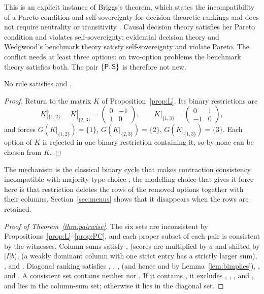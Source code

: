 This is an explicit instance of Briggs's theorem, which states the incompatibility of a Pareto
condition and self-sovereignty for decision-theoretic rankings and does not require neutrality or
transitivity \autocite[21--26]{briggs2010}. Causal decision theory satisfies her Pareto condition
and violates self-sovereignty; evidential decision theory and Wedgwood's benchmark theory
\autocite{wedgwood2013} satisfy self-sovereignty and violate Pareto. The conflict needs at least three
options: on two-option problems the benchmark theory satisfies both. The pair
$\{\textup{\textsf{P}},\textup{\textsf{S}}\}$ is therefore not new.

\begin{proposition}\label{prop:PC}
No rule satisfies  and .
\end{proposition}

\begin{proof}
Return to the matrix $K$ of Proposition~\ref{prop:L}. Its binary restrictions are
\[
  K|_{\{1,2\}}=K|_{\{2,3\}}=\begin{pmatrix}0&-1\\1&0\end{pmatrix},\qquad
  K|_{\{1,3\}}=\begin{pmatrix}0&1\\-1&0\end{pmatrix},
\]
and  forces $G(K|_{\{1,2\}})=\{1\}$, $G(K|_{\{2,3\}})=\{2\}$, $G(K|_{\{1,3\}})=\{3\}$. Each option
of $K$ is rejected in one binary restriction containing it, so by  none can be chosen from $K$.
\end{proof}

The mechanism is the classical binary cycle that makes contraction consistency incompatible with
majority-type choice \autocite{sen1970,brandtharrenstein2011}; the modelling choice that gives it
force here is that restriction deletes the rows of the removed options together with their columns.
Section~\ref{sec:menus} shows that it disappears when the rows are retained.

\begin{proof}[Proof of Theorem~\ref{thm:pairwise}]
The six sets are inconsistent by Propositions~\ref{prop:L}--\ref{prop:PC}, and each proper subset of
each pair is consistent by the witnesses. Column sums satisfy ,  (scores are multiplied by
$a$ and shifted by $|I|b$),  (a weakly dominant column with one strict entry has a strictly
larger sum), , and . Diagonal ranking satisfies , , ,  (and hence
 and  by Lemma~\ref{lem:bimplies}), , and . A consistent set contains neither
 nor . If it contains , it excludes , , , and , and lies in
the column-sum set; otherwise it lies in the diagonal set.
\end{proof}


